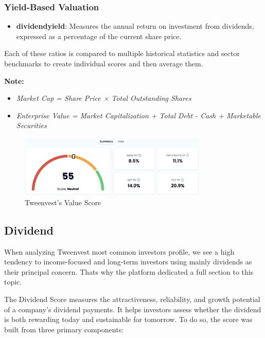 \documentclass[11pt,english,a4paper,hidelinks]{book}
\begin{document}
\subsubsection{Yield-Based Valuation}
\begin{itemize}
    \item \textbf{\acrshort{dividendyield}}: Measures the annual return on investment from dividends, expressed as a percentage of the current share price.
\end{itemize}

\vspace{0.5cm}
\noindent Each of these ratios is compared to multiple historical statistics and sector benchmarks to create individual scores and then average them.

\vspace{0.5cm}
\noindent \textbf{Note:}
\begin{itemize}
    \item \textit{Market Cap = Share Price × Total Outstanding Shares}
    \item \textit{Enterprise Value = Market Capitalization + Total Debt - Cash + Marketable Securities}
\end{itemize}

\begin{figure}[H]
    \centering
    \includegraphics[width=0.8\textwidth]{images/tweenvest/value score.png}
    \caption{Tweenvest's Value Score}
    \label{fig:valuation_score}
\end{figure}


\subsection{Dividend}
\noindent When analyzing Tweenvest most common investors profile, we see a high tendency to income-focused and long-term investors using mainly dividends as their principal concern. Thats why the platform dedicated a full section to this topic. 

\vspace{0.5cm}
\noindent The Dividend Score measures the attractiveness, reliability, and growth potential of a company's dividend payments. It helps investors assess whether the dividend is both rewarding today and sustainable for tomorrow. To do so, the score was built from three primary components:
\end{document}
